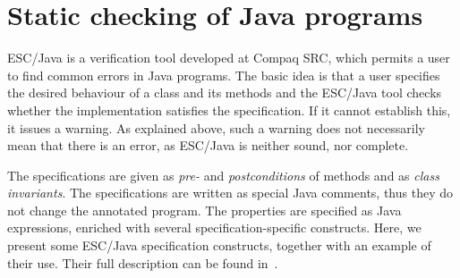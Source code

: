 \documentclass[a4paper]{llncs}
\begin{document}
\section{Static checking of Java programs}
\label{SectStatic}


\label{SubSectEscJava}

ESC/Java is a verification tool developed at Compaq SRC, which permits
a user to find common errors in Java programs. The basic idea is that
a user specifies the desired behaviour of a class and its methods and
the ESC/Java tool checks whether the implementation satisfies the
specification. If it cannot establish this, it issues a warning. As
explained above, such a warning does not necessarily mean that there
is an error, as ESC/Java is neither sound, nor complete.

The specifications are given as
\textit{pre-} and \textit{postconditions} of methods and as
\textit{class
invariants}. The specifications are written as special Java comments,
thus they do not change the annotated program.  The properties are
specified as Java expressions, enriched with several
specification-specific constructs. Here, we present some ESC/Java
specification constructs, together with an example of their use. Their
full description can be found in~\cite{LeinoNS00}.
\end{document}
